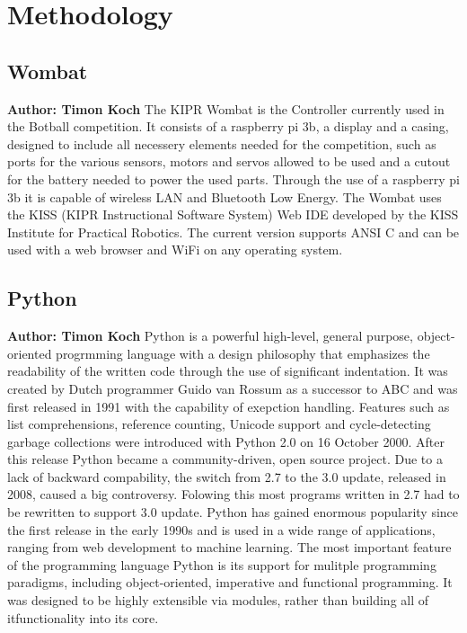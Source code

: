 \chapter{Methodology}

\section{Wombat}
\textbf{Author: Timon Koch}
The KIPR Wombat is the Controller currently used in the Botball competition. It consists of a raspberry pi 3b, a display and a casing, designed to include all necessery elements needed for the competition, such as ports for the various sensors, motors and servos allowed to be used and a cutout for the battery needed to power the used parts. Through the use of a raspberry pi 3b it is capable of wireless LAN and Bluetooth Low Energy. The Wombat uses the KISS (KIPR Instructional Software System) Web IDE developed by the KISS Institute for Practical Robotics. The current version supports ANSI C and can be used with a web browser and WiFi on any operating system.

\section{Python}
\textbf{Author: Timon Koch}
Python is a powerful high-level, general purpose, object-oriented progrmming language with a design philosophy that emphasizes the readability of the written code through the use of significant indentation. 
It was created by Dutch programmer Guido van Rossum as a successor to ABC and was first released in 1991 with the capability of exepction handling. 
Features such as list comprehensions, reference counting, Unicode support and cycle-detecting garbage collections were introduced with Python 2.0 on 16 October 2000. After this release Python became a community-driven, open source project.
Due to a lack of backward compability, the switch from 2.7 to the 3.0 update, released in 2008, caused a big controversy. Folowing this most programs written in 2.7 had to be rewritten to support 3.0 update. 
Python has gained enormous popularity since the first release in the early 1990s and is used in a wide range of applications, ranging from web development to machine learning. 
The most important feature of the programming language Python is its support for mulitple programming paradigms, including object-oriented, imperative and functional programming. It was designed to be highly extensible via modules, rather than building all of itfunctionality into its core.

